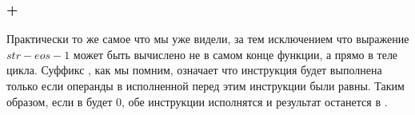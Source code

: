 
\subsubsection{\OptimizingKeil{} + \ARMMode}



Практически то же самое что мы уже видели, за тем исключением что выражение $str - eos - 1$ может быть вычислено
не в самом конце функции, а прямо в теле цикла. Суффикс , как мы помним, означает что инструкция будет выполнена только
если операнды в исполненной перед этим инструкции \CMP были равны. 
Таким образом, если в \Rzero будет 0, обе инструкции  исполнятся и результат останется в \Rzero.

